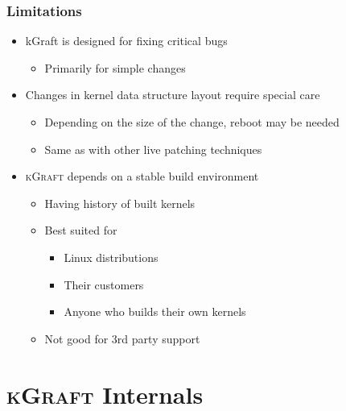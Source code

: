\documentclass[xcolor=dvipsnames,handout]{beamer}
\newcommand\kgr{\textsc{kGraft}\xspace}
\begin{document}
\begin{frame}
  \frametitle{Limitations}

  \begin{itemize}
    \item kGraft is designed for fixing critical bugs
    \begin{itemize}
      \item Primarily for simple changes
    \end{itemize}

    \pause

    \item Changes in kernel data structure layout require special care
    \begin{itemize}
      \item Depending on the size of the change, reboot may be needed
      \item Same as with other live patching techniques
    \end{itemize}

    \pause

    \item \kgr depends on a stable build environment
    \begin{itemize}
      \item Having history of built kernels
      \item Best suited for
      \begin{itemize}
	\item Linux distributions
	\item Their customers
	\item Anyone who builds their own kernels
      \end{itemize}
      \item Not good for 3rd party support 
    \end{itemize}
  \end{itemize}

\end{frame}

\section{\kgr Internals}
\frame{\sectionpage}
\end{document}
